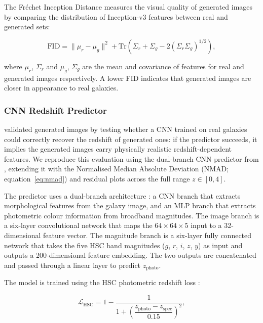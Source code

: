 \documentclass[fleqn,usenatbib]{mnras}
\begin{document}
The Fr\'{e}chet Inception Distance \citep[FID;][]{heusel2017} measures
the visual quality of generated images by comparing the distribution
of Inception-v3 \citep{szegedy2016} features between real and generated
sets:

\begin{equation}
    \mathrm{FID} =
        \|\mu_r - \mu_g\|^2
        + \mathrm{Tr}\!\left(
            \Sigma_r + \Sigma_g
            - 2\left(\Sigma_r \Sigma_g\right)^{1/2}
        \right),
    \label{eq:fid}
\end{equation}

where $\mu_r$, $\Sigma_r$ and $\mu_g$, $\Sigma_g$ are the mean and
covariance of features for real and generated images respectively.
A lower FID indicates that generated images are closer in appearance
to real galaxies.

\subsubsection{CNN Redshift Predictor}
\label{sec:cnn_z}

\citet{lizarraga2024} validated generated images by testing whether a
CNN trained on real galaxies could correctly recover the redshift of
generated ones: if the predictor succeeds, it implies the generated
images carry physically realistic redshift-dependent features.
We reproduce this evaluation using the dual-branch CNN predictor from
\citet{li2024}, extending it with the Normalised Median Absolute
Deviation (NMAD; equation~\ref{eq:nmad}) and residual plots across
the full range $z \in [0, 4]$.

The predictor uses a dual-branch architecture \citep{li2024}: a CNN
branch that extracts morphological features from the galaxy image, and
an MLP branch that extracts photometric colour information from
broadband magnitudes.
The image branch is a six-layer convolutional network that maps the
$64 \times 64 \times 5$ input to a 32-dimensional feature vector.
The magnitude branch is a six-layer fully connected network that takes
the five HSC band magnitudes ($g$, $r$, $i$, $z$, $y$) as input
and outputs a 200-dimensional feature embedding.
The two outputs are concatenated and passed through a linear layer to
predict $z_{\mathrm{photo}}$.



The model is trained using the HSC photometric redshift loss \citep{nishizawa2020}:

\begin{equation}
    \mathcal{L}_{\mathrm{HSC}} =
        1 - \frac{1}{1 + \left(\dfrac{z_{\mathrm{photo}} -
        z_{\mathrm{spec}}}{0.15}\right)^2},
    \label{eq:hsc_loss}
\end{equation}
\end{document}
